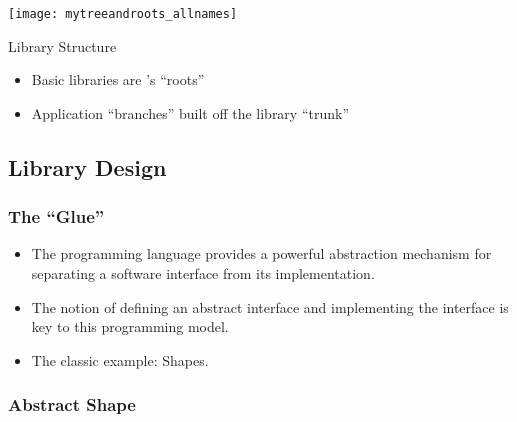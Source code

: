 \begin{frame}[t]


    \begin{minipage}[h]{.6\textwidth}
    \begin{center}
      \texttt{[image: mytreeandroots\_allnames]}
    \end{center}
  \end{minipage}
  \begin{minipage}[h]{.35\textwidth}
    \begin{block}{Library Structure}
      \begin{itemize}
    \item Basic libraries are \LibMesh's ``roots''
    \item Application ``branches'' built off the library ``trunk''
      \end{itemize}
    \end{block}
  \end{minipage}



\end{frame}



\subsection{Library Design}
\frame
{
  \frametitle{The ``Glue''}
  \begin{itemize}
    \item The \cpp{} programming language provides a powerful abstraction mechanism for separating a software interface from its implementation.
    \item The notion of  defining an abstract interface and  implementing the interface is key to this programming model.
      \pause
    \item The classic \cpp{} example: Shapes.
  \end{itemize}
  
}



\frame
{
  \frametitle{Abstract Shape}
  
}



